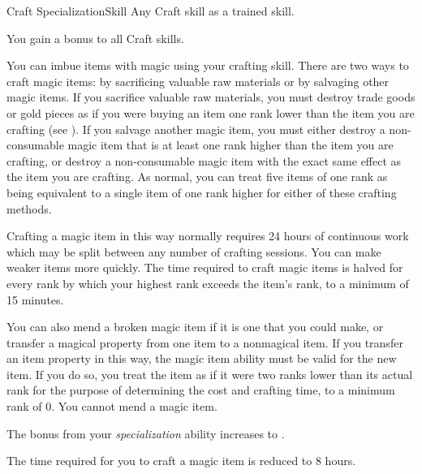   \begin{feat}{Craft Specialization}{Skill}
    \featpre Any Craft skill as a trained skill.

     You gain a  bonus to all Craft skills.

     You can imbue items with magic using your crafting skill.
    There are two ways to craft magic items: by sacrificing valuable raw materials or by salvaging other magic items.
    If you sacrifice valuable raw materials, you must destroy trade goods or gold pieces as if you were buying an item one rank lower than the item you are crafting  (see ).
    If you salvage another magic item, you must either destroy a non-consumable magic item that is at least one rank higher than the item you are crafting, or destroy a non-consumable magic item with the exact same effect as the item you are crafting.
    As normal, you can treat five items of one rank as being equivalent to a single item of one rank higher for either of these crafting methods.

    Crafting a magic item in this way normally requires 24 hours of continuous work which may be split between any number of crafting sessions.
    You can make weaker items more quickly.
    The time required to craft magic items is halved for every rank by which your highest rank exceeds the item's rank, to a minimum of 15 minutes.

    You can also mend a broken magic item if it is one that you could make, or transfer a magical property from one item to a nonmagical item.
    If you transfer an item property in this way, the magic item ability must be valid for the new item.
    If you do so, you treat the item as if it were two ranks lower than its actual rank for the purpose of determining the cost and crafting time, to a minimum rank of 0.
    You cannot mend a  magic item.

     The bonus from your \textit{specialization} ability increases to .

     The time required for you to craft a magic item is reduced to 8 hours.
  \end{feat}

